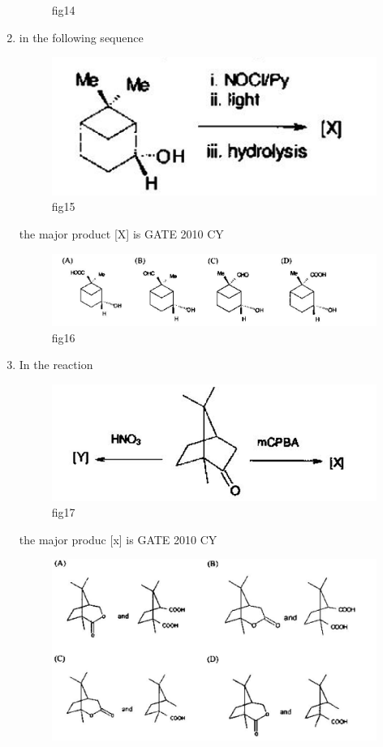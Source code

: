 \documentclass[journal,12pt,onecolumn]{IEEEtran}
\theoremstyle{remark}
\begin{document}
\begin{enumerate}
\begin{figure}[H]
    \caption{fig14}
    \label{fig:figs/Q.35.2.png}
\end{figure}
\item 
in the following sequence
\begin{figure}[H]
    \centering
    \includegraphics[width=0.5\linewidth]{figs/Q.36.png}
    \caption{fig15}
    \label{fig:figs/Q.36.png}
\end{figure}
the major product [X] is
\hfill{GATE 2010 CY}
\begin{figure}[H]
    \centering
    \includegraphics[width=0.75\linewidth]{figs/Q.36.1.png}
    \caption{fig16}
    \label{fig:figs/Q.36.1.png}
\end{figure}
\item 
In the reaction
\begin{figure}[H]
    \centering
    \includegraphics[width=0.5\linewidth]{figs/Q.17.png}
    \caption{fig17}
    \label{fig:figs/Q.17.png}
\end{figure}
the major produc [x] is
\hfill{GATE 2010 CY}
\begin{figure}[H]
    \centering
    \includegraphics[width=0.75\linewidth]{figs/Q.37.1.png}

\end{figure}
\end{enumerate}
\end{document}
